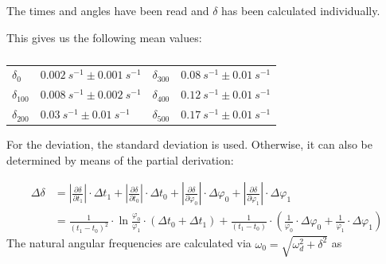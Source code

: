         The times and angles have been read and $\delta$ has been calculated individually.\par
        This gives us the following mean values:\par
        \begin{table}[h]
            \centering
            \caption[Mean values of the dampening coefficient]{}
            \begin{tabular}{@{}llll@{}}
                \toprule
                $\delta_0$        &$\SI{0.002}{s^{-1}} \pm \SI{0.001}{s^{-1}}$  &\hspace{10mm}$\delta_{300}$ &$\SI{0.08}{s^{-1}} \pm \SI{0.01}{s^{-1}}$\\
                $\delta_{100}$    &$\SI{0.008}{s^{-1}} \pm \SI{0.002}{s^{-1}}$  &\hspace{10mm}$\delta_{400}$ &$\SI{0.12}{s^{-1}} \pm \SI{0.01}{s^{-1}}$\\
                $\delta_{200}$    &$\SI{0.03}{s^{-1}} \pm \SI{0.01}{s^{-1}}$    &\hspace{10mm}$\delta_{500}$ &$\SI{0.17}{s^{-1}} \pm \SI{0.01}{s^{-1}}$\\
                \bottomrule
            \end{tabular}
            \label{tab:dampening_coefficients}
        \end{table}
        For the deviation, the standard deviation is used. Otherwise, it can also be determined by means of the partial derivation:\par
        \begin{align}
            \Delta\delta    &= \left| \frac{\partial\delta}{\partial t_1} \right| \cdot \Delta t_1 + \left| \frac{\partial\delta}{\partial t_0} \right| \cdot \Delta t_0 + \left| \frac{\partial\delta}{\partial \varphi_0} \right| \cdot \Delta \varphi_0 + \left| \frac{\partial\delta}{\partial \varphi_1} \right| \cdot \Delta \varphi_1 \nonumber\\
                            &= \frac{1}{(t_1-t_0)^2} \cdot \ln{\frac{\varphi_0}{\varphi_1}} \cdot (\Delta t_0 + \Delta t_1) + \frac{1}{(t_1-t_0)} \cdot \left( \frac{1}{\varphi_0} \cdot \Delta\varphi_0 + \frac{1}{\varphi_1} \cdot \Delta\varphi_1 \right)
        \end{align}
        The natural angular frequencies are calculated via $ \omega_0=\sqrt{\omega_d^2+\delta^2} $ as\par
